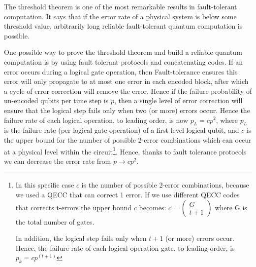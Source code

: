The threshold theorem is one of the most remarkable results in fault-tolerant computation. It says that if the error rate of a physical system is below some threshold value, arbitrarily long reliable fault-tolerant quantum computation is possible.




One possible way to prove the threshold theorem and build a reliable quantum computation is by using fault tolerant protocols and concatenating codes.
If an error occurs during a logical gate operation, then Fault-tolerance ensures this error will only propagate to at most one error in each encoded block, after which a cycle of error correction will remove the error. Hence if the failure probability of un-encoded qubits per time step is $p$, then a single level of error correction will ensure that the logical step fails only when two (or more) errors occur. Hence the failure rate of each logical operation, to leading order, is now $p_L = cp^2$, where $p_L$ is the failure rate (per logical gate operation) of a first level logical qubit, and $c$ is the upper bound for the number of possible 2-error combinations which can occur at a physical level within the circuit\footnote{In this specific case $c$ is the number of possible 2-error combinations, because we used a QECC that can correct 1 error. If we use different QECC codes that corrects t-errors the upper bound $c$ becomes: $c=\left(\begin{array}{c}
       G\\
       t+1
 \end{array}\right)$ where G is the total number of gates. 
 
 
 In addition, the logical step fails only when $t+1$ (or more) errors occur. Hence, the failure rate of each logical operation gate, to leading order, is $p_k = cp^{(t+1)}$
 
 
 }.
Hence, thanks to fault tolerance protocols we can decrease the error rate from $p \to cp^2$. 


